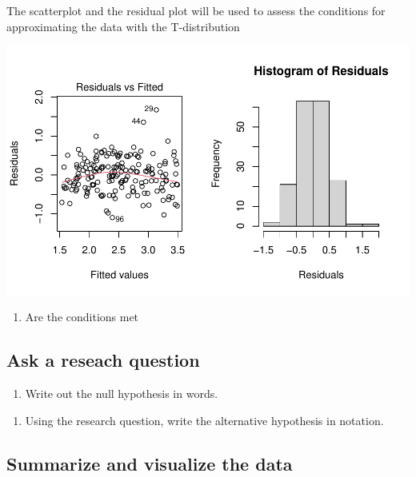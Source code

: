 \documentclass[
]{report}
\providecommand{\tightlist}{%
  \setlength{\itemsep}{0pt}\setlength{\parskip}{0pt}}
\begin{document}
The scatterplot and the residual plot will be used to assess the conditions for approximating the data with the T-distribution

\begin{center}\includegraphics[width=0.7\linewidth]{10-regression_files/figure-latex/unnamed-chunk-3-1} \end{center}

\begin{enumerate}
\def\labelenumi{\arabic{enumi}.}
\setcounter{enumi}{4}
\tightlist
\item
  Are the conditions met
\end{enumerate}

\vspace{1in}

\hypertarget{ask-a-reseach-question}{%
\subsection{Ask a reseach question}\label{ask-a-reseach-question}}

\begin{enumerate}
\def\labelenumi{\arabic{enumi}.}
\setcounter{enumi}{5}
\tightlist
\item
  Write out the null hypothesis in words.
\end{enumerate}

\vspace{1in}

\begin{enumerate}
\def\labelenumi{\arabic{enumi}.}
\setcounter{enumi}{6}
\tightlist
\item
  Using the research question, write the alternative hypothesis in notation.
\end{enumerate}

\vspace{0.5in}

\hypertarget{summarize-and-visualize-the-data}{%
\subsection{Summarize and visualize the data}\label{summarize-and-visualize-the-data}}
\end{document}
